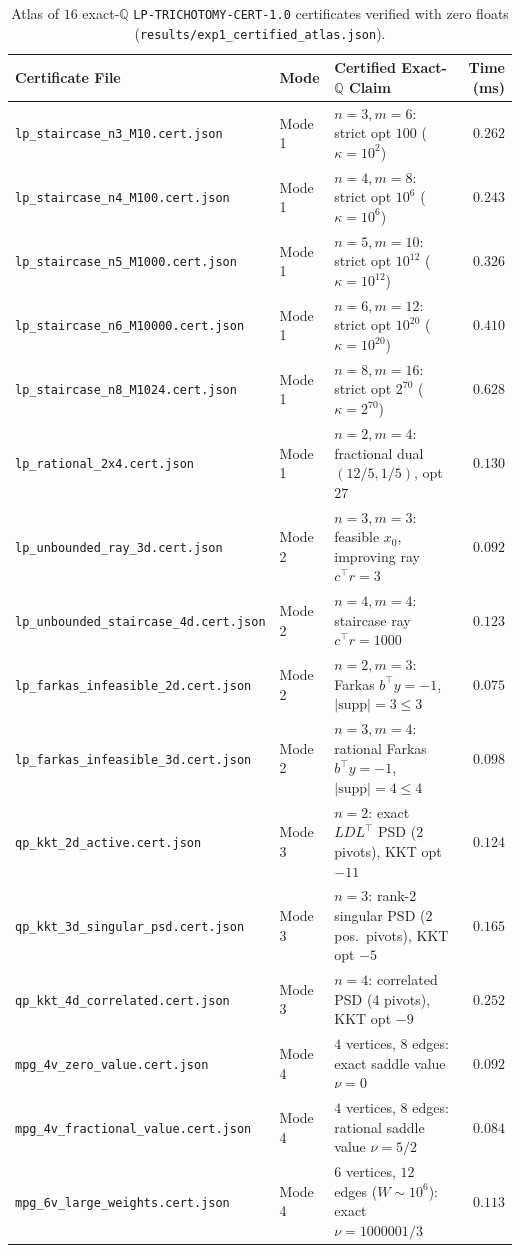 \documentclass[11pt,a4paper]{article}
\theoremstyle{definition}
\theoremstyle{remark}
\newcommand{\QQ}{\mathbb{Q}}
\newcommand{\certschema}{\texttt{LP-TRICHOTOMY-CERT-1.0}}
\begin{document}
\begin{table}[t]
\centering
\caption{Atlas of $16$ exact-$\QQ$ \certschema{} certificates verified with zero floats (\texttt{results/exp1\_certified\_atlas.json}).}
\label{tab:atlas}
\scriptsize
\setlength{\tabcolsep}{3pt}
\begin{tabular}{@{}lllr@{}}
\toprule
Certificate File & Mode & Certified Exact-$\QQ$ Claim & Time (ms) \\
\midrule
\texttt{lp\_staircase\_n3\_M10.cert.json} & Mode 1 & $n=3, m=6$: strict opt $100$ ($\kappa=10^2$) & $0.262$ \\
\texttt{lp\_staircase\_n4\_M100.cert.json} & Mode 1 & $n=4, m=8$: strict opt $10^6$ ($\kappa=10^6$) & $0.243$ \\
\texttt{lp\_staircase\_n5\_M1000.cert.json} & Mode 1 & $n=5, m=10$: strict opt $10^{12}$ ($\kappa=10^{12}$) & $0.326$ \\
\texttt{lp\_staircase\_n6\_M10000.cert.json} & Mode 1 & $n=6, m=12$: strict opt $10^{20}$ ($\kappa=10^{20}$) & $0.410$ \\
\texttt{lp\_staircase\_n8\_M1024.cert.json} & Mode 1 & $n=8, m=16$: strict opt $2^{70}$ ($\kappa=2^{70}$) & $0.628$ \\
\texttt{lp\_rational\_2x4.cert.json} & Mode 1 & $n=2, m=4$: fractional dual $(12/5,1/5)$, opt $27$ & $0.130$ \\
\midrule
\texttt{lp\_unbounded\_ray\_3d.cert.json} & Mode 2 & $n=3, m=3$: feasible $x_0$, improving ray $c^\top r = 3$ & $0.092$ \\
\texttt{lp\_unbounded\_staircase\_4d.cert.json} & Mode 2 & $n=4, m=4$: staircase ray $c^\top r = 1000$ & $0.123$ \\
\texttt{lp\_farkas\_infeasible\_2d.cert.json} & Mode 2 & $n=2, m=3$: Farkas $b^\top y = -1$, $|\mathrm{supp}| = 3 \le 3$ & $0.075$ \\
\texttt{lp\_farkas\_infeasible\_3d.cert.json} & Mode 2 & $n=3, m=4$: rational Farkas $b^\top y = -1$, $|\mathrm{supp}| = 4 \le 4$ & $0.098$ \\
\midrule
\texttt{qp\_kkt\_2d\_active.cert.json} & Mode 3 & $n=2$: exact $LDL^\top$ PSD (2 pivots), KKT opt $-11$ & $0.124$ \\
\texttt{qp\_kkt\_3d\_singular\_psd.cert.json} & Mode 3 & $n=3$: rank-2 singular PSD (2 pos.\ pivots), KKT opt $-5$ & $0.165$ \\
\texttt{qp\_kkt\_4d\_correlated.cert.json} & Mode 3 & $n=4$: correlated PSD (4 pivots), KKT opt $-9$ & $0.252$ \\
\midrule
\texttt{mpg\_4v\_zero\_value.cert.json} & Mode 4 & $4$ vertices, $8$ edges: exact saddle value $\nu = 0$ & $0.092$ \\
\texttt{mpg\_4v\_fractional\_value.cert.json} & Mode 4 & $4$ vertices, $8$ edges: rational saddle value $\nu = 5/2$ & $0.084$ \\
\texttt{mpg\_6v\_large\_weights.cert.json} & Mode 4 & $6$ vertices, $12$ edges ($W \sim 10^6$): exact $\nu = 1000001/3$ & $0.113$ \\
\bottomrule
\end{tabular}
\end{table}
\end{document}
